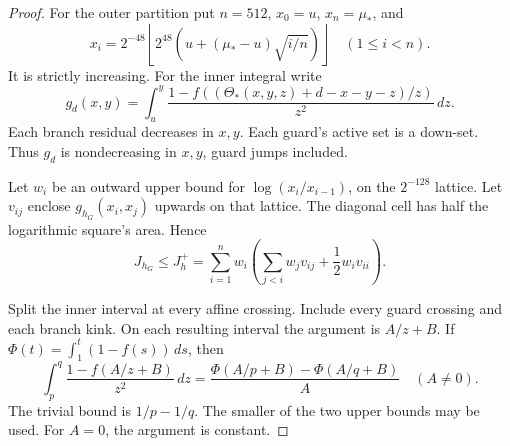 \begin{proof}
For the outer partition put \(n=512\), \(x_0=u\), \(x_n=\mu_*\), and
\begin{equation}\label{eq:app-m5-mesh}
 x_i=2^{-48}\left\lfloor2^{48}
       \left(u+(\mu_*-u)\sqrt{i/n}\right)\right\rfloor
       \quad(1\le i<n).
\end{equation}
It is strictly increasing.
For the inner integral write
\begin{equation}\label{eq:app-inner}
 g_d(x,y)=\int_u^y
 \frac{1-f((\Theta_*(x,y,z)+d-x-y-z)/z)}{z^2}\,dz.
\end{equation}
Each branch residual decreases in \(x,y\).
Each guard's active set is a down-set.
Thus \(g_d\) is nondecreasing in \(x,y\),
guard jumps included.

Let \(w_i\) be an outward upper bound for
\(\log(x_i/x_{i-1})\), on the \(2^{-128}\) lattice.
Let \(v_{ij}\) enclose \(g_{h_G}(x_i,x_j)\) upwards
on that lattice.
The diagonal cell has half the logarithmic square's area.
Hence
\begin{equation}\label{eq:app-upper-corners}
 J_{h_G}\le J_h^+
 =\sum_{i=1}^n w_i\left(
 \sum_{j<i}w_jv_{ij}+\frac12w_iv_{ii}\right).
\end{equation}

Split the inner interval at every affine crossing.
Include every guard crossing and each branch kink.
On each resulting interval the argument is \(A/z+B\).
If \(\Phi(t)=\int_1^t(1-f(s))\,ds\), then
\begin{equation}\label{eq:app-inner-primitive}
 \int_p^q\frac{1-f(A/z+B)}{z^2}\,dz
 =\frac{\Phi(A/p+B)-\Phi(A/q+B)}{A}
 \quad(A\ne0).
\end{equation}
The trivial bound is \(1/p-1/q\).
The smaller of the two upper bounds may be used.
For \(A=0\), the argument is constant.


\end{proof}
